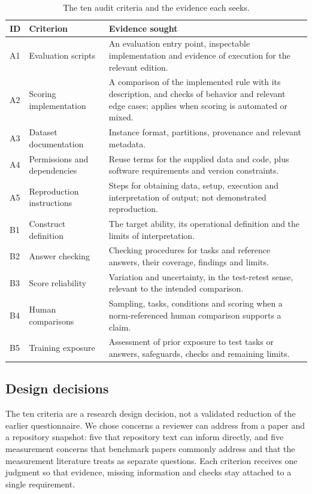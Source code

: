 \documentclass[10pt,conference]{IEEEtran}
\begin{document}
\begin{table}[t]
\caption{The ten audit criteria and the evidence each seeks.}
\label{tab:criteria}
\small
\begin{tabularx}{\textwidth}{@{}lp{}X@{}}
\toprule
ID & Criterion & Evidence sought \\
\midrule
A1 & Evaluation scripts & An evaluation entry point, inspectable implementation and evidence of execution for the relevant edition. \\
A2 & Scoring implementation & A comparison of the implemented rule with its description, and checks of behavior and relevant edge cases; applies when scoring is automated or mixed. \\
A3 & Dataset documentation & Instance format, partitions, provenance and relevant metadata. \\
A4 & Permissions and dependencies & Reuse terms for the supplied data and code, plus software requirements and version constraints. \\
A5 & Reproduction instructions & Steps for obtaining data, setup, execution and interpretation of output; not demonstrated reproduction. \\
B1 & Construct definition & The target ability, its operational definition and the limits of interpretation. \\
B2 & Answer checking & Checking procedures for tasks and reference answers, their coverage, findings and limits. \\
B3 & Score reliability & Variation and uncertainty, in the test-retest sense, relevant to the intended comparison. \\
B4 & Human comparisons & Sampling, tasks, conditions and scoring when a norm-referenced human comparison supports a claim. \\
B5 & Training exposure & Assessment of prior exposure to test tasks or answers, safeguards, checks and remaining limits. \\
\bottomrule
\end{tabularx}
\end{table}

\subsection{Design decisions}
The ten criteria are a research design decision, not a validated reduction of the earlier questionnaire. We chose concerns a reviewer can address from a paper and a repository snapshot: five that repository text can inform directly, and five measurement concerns that benchmark papers commonly address and that the measurement literature treats as separate questions. Each criterion receives one judgment so that evidence, missing information and checks stay attached to a single requirement.
\end{document}
